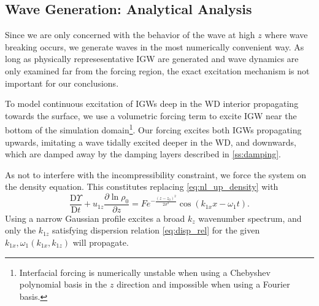 \documentclass[
        fleqn,
        usenatbib,
    ]{mnras}
\newcommand*{\pd}[2]{\frac{\partial#1}{\partial#2}}
\newcommand*{\md}[2]{\frac{\mathrm{D}#1}{\mathrm{D}#2}}
\newcommand*{\p}[1]{\left(#1\right)}
\begin{document}
\subsection{Wave Generation: Analytical Analysis}

Since we are only concerned with the behavior of the wave at high $z$ where wave
breaking occurs, we generate waves in the most numerically convenient way. As
long as physically represesentative IGW are generated and wave dynamics are only
examined far from the forcing region, the exact excitation mechanism is not
important for our conclusions.

To model continuous excitation of IGWs deep in the WD interior propagating
towards the surface, we use a volumetric forcing term to excite IGW near the
bottom of the simulation domain\footnote{Interfacial forcing is numerically
unstable when using a Chebyshev polynomial basis in the $z$ direction and
impossible when using a Fourier basis.}. Our forcing excites both IGWs
propagating upwards, imitating a wave tidally excited deeper in the WD, and
downwards, which are damped away by the damping layers described in
\autoref{ss:damping}.

As not to interfere with the incompressibility constraint, we force the system
on the density equation. This constitutes replacing \autoref{eq:nl_up_density}
with
\begin{equation}
    \md{\Upsilon}{t} + u_{1z}\pd{\ln \rho_0}{z}
        = Fe^{-\frac{(z - z_0)^2}{2\sigma^2}}
            \cos \p{k_{1x}x - \omega_1 t}.\label{eq:vol_drive}
\end{equation}
Using a narrow Gaussian profile excites a broad $k_z$ wavenumber spectrum, and
only the $k_{1z}$ satisfying dispersion relation \autoref{eq:disp_rel} for the
given $k_{1x}, \omega_1(k_{1x}, k_{1z})$ will propagate.
\end{document}
